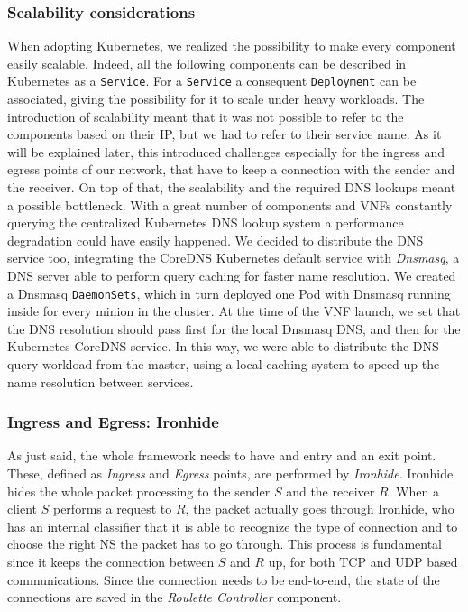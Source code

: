\subsubsection{Scalability considerations}
When adopting Kubernetes, we realized the possibility to make every component
easily scalable. Indeed, all the following components can be described in
Kubernetes as a \verb!Service!. For a \verb!Service! a consequent
\verb!Deployment! can be associated, giving the possibility for it to scale
under heavy workloads. The introduction of scalability meant that it was not
possible to refer to the components based on their IP, but we had to refer to
their service name. As it will be explained later, this introduced challenges
especially for the ingress and egress points of our network, that have to keep a
connection with the sender and the receiver. On top of that, the scalability and
the required DNS lookups meant a possible bottleneck. With a great number of
components and VNFs constantly querying the centralized Kubernetes DNS lookup
system a performance degradation could have easily happened. We decided to
distribute the DNS service too, integrating the CoreDNS Kubernetes default
service with \emph{Dnsmasq}, a DNS server able to perform query caching for
faster name resolution. We created a Dnsmasq \verb!DaemonSets!, which in turn
deployed one Pod with Dnsmasq running inside for every minion in the cluster. At
the time of the VNF launch, we set that the DNS resolution should pass first for
the local Dnsmasq DNS, and then for the Kubernetes CoreDNS service. In this way,
we were able to distribute the DNS query workload from the master, using a local
caching system to speed up the name resolution between services.

\subsubsection{Ingress and Egress: Ironhide}
As just said, the whole framework needs to have and entry and an exit point.
These, defined as \emph{Ingress} and \emph{Egress} points, are performed by
\emph{Ironhide}. Ironhide hides the whole packet processing to the sender $S$
and the receiver $R$. When a client $S$ performs a request to $R$, the packet
actually goes through Ironhide, who has an internal classifier that it is able
to recognize the type of connection and to choose the right NS the packet has to
go through. This process is fundamental since it keeps the connection between
$S$ and $R$ up, for both TCP and UDP based communications. Since the connection
needs to be end-to-end, the state of the connections are saved in the
\emph{Roulette Controller} component.

